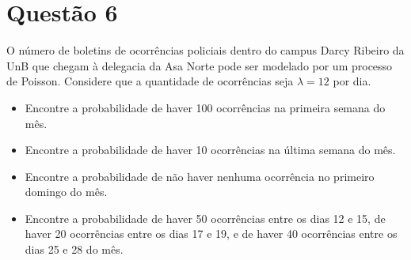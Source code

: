 \section{Questão 6}

O número de boletins de ocorrências policiais dentro do campus Darcy Ribeiro da UnB que chegam à delegacia da Asa Norte pode ser modelado por um processo de Poisson. 
Considere que a quantidade de ocorrências seja $\lambda = 12$ por dia.
%
\begin{itemize}
\item[a)] Encontre a probabilidade de haver 100 ocorrências na primeira semana do mês.
\item[b)] Encontre a probabilidade de haver 10 ocorrências na última semana do mês.
\item[c)] Encontre a probabilidade de não haver nenhuma ocorrência no primeiro domingo do mês.
\item[d)] Encontre a probabilidade de haver 50 ocorrências entre os dias 12 e 15, 
de haver 20 ocorrências entre os dias 17 e 19, 
e de haver 40 ocorrências entre os dias 25 e 28 do mês.
\end{itemize}

